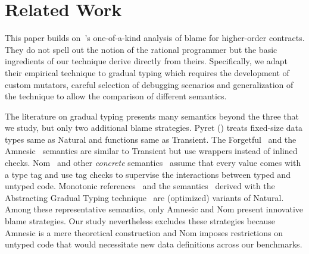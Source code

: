 \section{Related Work}

This paper builds on~\citet{lksfd-popl-2020}'s one-of-a-kind analysis of
blame for higher-order contracts. They do not spell out the notion of the
rational programmer but the basic ingredients of our technique derive
directly from theirs. Specifically, we adapt their empirical technique
to gradual typing which requires the development of custom mutators,
careful selection of debugging scenarios and generalization of the
technique to allow the comparison of different semantics.

The literature on gradual typing presents many semantics beyond the three
that we study, but only two additional blame strategies.
Pyret () treats fixed-size data types same as Natural
and functions same as Transient. The Forgetful~\cite{cl-icfp-2017} and
the Amnesic~\cite{gfd-oopsla-2019} semantics are similar to Transient but
use wrappers instead of inlined checks.  Nom~\cite{mt-oopsla-2017} and
other \emph{concrete\/} semantics~\cite{wnlov-popl-2010, rsfbv-popl-2015,
rzv-ecoop-2015, rat-oopsla-2017} assume that every value comes with a type tag
and use tag checks to supervise the interactions between typed and untyped code.
Monotonic
references~\cite{svctg-esop-2015} and the semantics~\cite{tlt-popl-2019,
etg-icfp-19, tt-scp-20, tgt-popl-18, tt-sas-17} derived with the
Abstracting Gradual Typing
technique~\cite{gct-popl-2016} are (optimized) variants of Natural.
Among these representative semantics, only Amnesic and Nom present innovative
blame strategies.
Our study nevertheless excludes these strategies because Amnesic is a mere
theoretical construction and Nom imposes restrictions on untyped
code that would necessitate new data definitions across our benchmarks.
 
